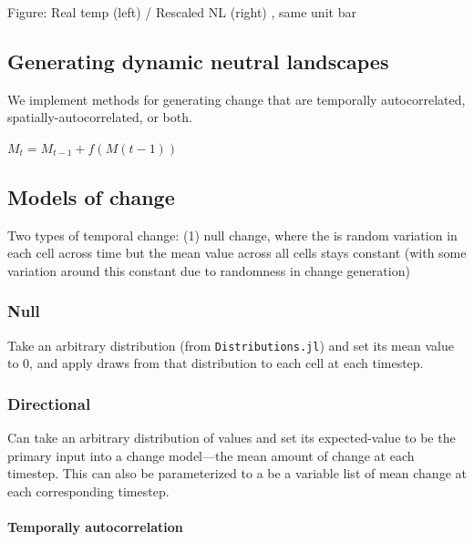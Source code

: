 \documentclass[11pt]{article}
\begin{document}
Figure: Real temp (left) / Rescaled NL (right) , same unit bar

\hypertarget{generating-dynamic-neutral-landscapes}{%
\subsection{Generating dynamic neutral
landscapes}\label{generating-dynamic-neutral-landscapes}}

We implement methods for generating change that are temporally
autocorrelated, spatially-autocorrelated, or both.

\(M_t = M_{t-1} + f(M(t-1))\)

\hypertarget{models-of-change}{%
\subsection{Models of change}\label{models-of-change}}

Two types of temporal change: (1) null change, where the is random
variation in each cell across time but the mean value across all cells
stays constant (with some variation around this constant due to
randomness in change generation)

\hypertarget{null}{%
\subsubsection{Null}\label{null}}

Take an arbitrary distribution (from \texttt{Distributions.jl}) and set
its mean value to 0, and apply draws from that distribution to each cell
at each timestep.

\hypertarget{directional}{%
\subsubsection{Directional}\label{directional}}

Can take an arbitrary distribution of values and set its expected-value
to be the primary input into a change model---the mean amount of change
at each timestep. This can also be parameterized to a be a variable list
of mean change at each corresponding timestep.

\hypertarget{temporally-autocorrelation}{%
\paragraph{Temporally
autocorrelation}\label{temporally-autocorrelation}}
\end{document}

